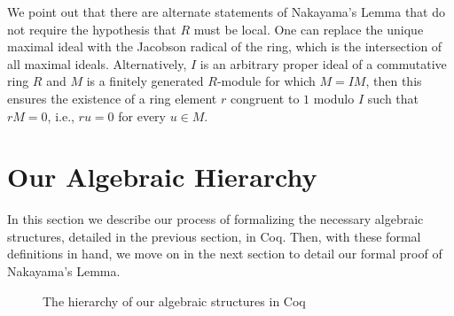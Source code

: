 \documentclass[referee,sn-mathphys]{sn-jnl}
\theoremstyle{definition}
\theoremstyle{remark}
\numberwithin{equation}{section}
\numberwithin{figure}{subsection}
\begin{document}
We point out that there are alternate statements of Nakayama's Lemma that do
not require the hypothesis that $R$ must be local. One can replace the unique
maximal ideal with the Jacobson radical of the ring, which is the intersection
of all maximal ideals. Alternatively, $I$ is an arbitrary proper ideal of a
commutative ring $R$ and $M$ is a finitely generated $R$-module for which
$M=I M$, then this ensures the existence of a ring element $r$ congruent to
$1$ modulo $I$ such that $r M = 0$, i.e., $r u = 0$ for every $u \in M$. 

\section{Our Algebraic Hierarchy}
In this section we describe our process of formalizing the necessary algebraic
structures, detailed in the previous section, in Coq. Then, with these formal definitions 
 in hand, we move
on in the next section to detail our formal proof of Nakayama's Lemma.

\begin{figure}[t]
  \caption{The hierarchy of our algebraic structures in Coq}
  \vspace{.3cm}
  \centering
  \label{alg-heirarchy: F}
\end{figure}
\end{document}
